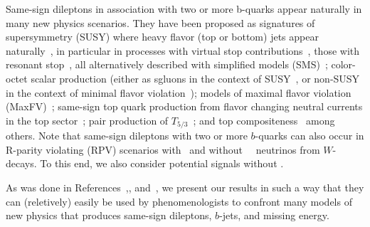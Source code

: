 Same-sign dileptons in association with two or more b-quarks appear naturally in many new physics scenarios.
They have been proposed as signatures of supersymmetry 
(SUSY) where heavy flavor (top or bottom) jets appear naturally~\cite{naturalness1,naturalness2,naturalness3,naturalness4},
in particular in processes with virtual stop contributions~\cite{stopVirtual,stopVirtualPRD},
those with resonant stop~\cite{stopReal},
all alternatively described with simplified models (SMS)~\cite{wacker}; 
color-octet scalar production (either as sgluons in the context of SUSY~\cite{sgluons},
or non-SUSY in the context of minimal flavor violation~\cite{colorOctetScalars}); 
models of maximal flavor violation (MaxFV)~\cite{mxflv1,mxflv2,mxflv3}; 
same-sign top quark production from flavor changing neutral currents in the top sector~\cite{fcnczprime};
pair production of $T_{5/3}$~\cite{t53};
and top compositeness~\cite{topcomp1,topcomp2,topcomp3}
among others.  Note that same-sign dileptons with two or more $b$-quarks
can also occur in R-parity violating (RPV) scenarios
with~\cite{rpvnomet} and without~\met~\cite{rpvwmet} neutrinos from $W$-decays.
To this end, we also consider potential signals
without \met.

As was done in References~\cite{sspaper2010},\cite{sspaper2011},
and~\cite{ssnote2011}, we present our results in such a way that 
they can (reletively) easily be used by phenomenologists to
confront many models of new physics that produces same-sign 
dileptons, $b$-jets, and missing energy.

